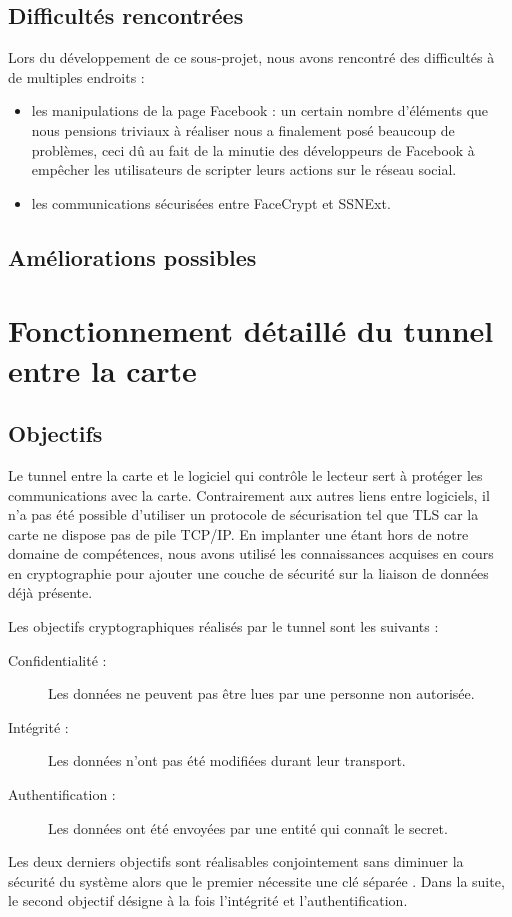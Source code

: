 \documentclass[a4paper,11pt,french]{article}
\begin{document}
\subsection{Difficultés rencontrées}
Lors du développement de ce sous-projet, nous avons rencontré des difficultés
à de multiples endroits :
\begin{itemize}
    \item les manipulations de la page Facebook : un certain nombre d'éléments 
    que nous pensions triviaux à réaliser nous a finalement posé beaucoup de 
    problèmes, ceci dû au fait de la minutie des développeurs de Facebook à
    empêcher les utilisateurs de \og{}scripter \fg{} leurs actions sur le réseau
    social.
    \item les communications sécurisées entre FaceCrypt et SSNExt. %
\end{itemize}

\subsection{Améliorations possibles}


\clearpage

\appendix

\section{Fonctionnement détaillé du tunnel entre la carte}
\label{TunnelSS}


\subsection{Objectifs}
Le tunnel entre la carte et le logiciel qui contr\^ole le lecteur sert à 
protéger les communications avec la carte. Contrairement aux autres liens entre 
logiciels, il n'a pas été possible d'utiliser un protocole de sécurisation tel 
que TLS car la carte ne dispose pas de pile TCP/IP. En implanter une étant hors
de notre domaine de compétences, nous avons utilisé les connaissances acquises 
en cours en cryptographie pour ajouter une couche de sécurité sur la liaison de 
données déjà présente. 

Les objectifs cryptographiques réalisés par le tunnel sont les suivants : 
\begin{description}
    \item[Confidentialité :] Les données ne peuvent pas être lues par une 
        personne non autorisée.
    \item[Intégrité :] Les données n'ont pas été modifiées durant leur 
        transport.
    \item[Authentification :] Les données ont été envoyées par une entité qui 
        connaît le secret.
\end{description}
Les deux derniers objectifs sont réalisables conjointement sans diminuer la 
sécurité du système alors que le premier nécessite une clé séparée \cite[section
2.5.1]{RGS ANSSI}. Dans la suite, le second objectif désigne à la fois 
l'intégrité et l'authentification. 
\end{document}
